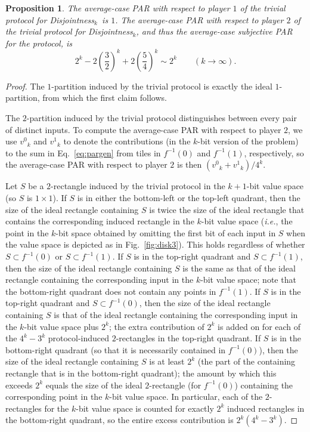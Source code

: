 \documentclass{article}
\theoremstyle{theorem}
\newtheorem{prop}[theorem]{Proposition}
\theoremstyle{definition}
\theoremstyle{remark}
\newcommand{\ie}{\emph{i.e.}}
\newcommand{\disjoint}{{\sc Dis\-joint\-ness}\ensuremath{_k}}
\newcommand{\svn}{\ensuremath{v^0}}
\newcommand{\svy}{\ensuremath{v^1}}
\begin{document}
\begin{prop}
The average-case PAR with respect to player $1$ of the trivial protocol for \disjoint\ is $1$.  The average-case PAR with respect to player $2$ of the trivial protocol for \disjoint, and thus the average-case subjective PAR for the protocol, is
\[
2^k -2\left(\frac{3}{2}\right)^k + 2\left(\frac{5}{4}\right)^k \sim 2^k\qquad (k\rightarrow\infty).
\]
\end{prop}
\begin{proof}
The $1$-partition induced by the trivial protocol is exactly the ideal $1$-partition, from which the first claim follows.

The $2$-partition induced by the trivial protocol distinguishes between every pair of distinct inputs.  To compute the average-case PAR with respect to player $2$, we use $\svn_k$ and $\svy_k$ to denote the contributions (in the $k$-bit version of the problem) to the sum in Eq.~\ref{eq:pargen} from tiles in $f^{-1}(0)$ and $f^{-1}(1)$, respectively, so the average-case PAR with respect to player $2$ is then $\left(\svn_k+\svy_k\right)/4^k$.

Let $S$ be a $2$-rectangle induced by the trivial protocol in the $k+1$-bit value space (so $S$ is $1\times 1$).  If $S$ is in either the bottom-left or the top-left quadrant, then the size of the ideal rectangle containing $S$ is twice the size of the ideal rectangle that contains the corresponding induced rectangle in the $k$-bit value space (\ie, the point in the $k$-bit space obtained by omitting the first bit of each input in $S$ when the value space is depicted as in Fig.~\ref{fig:disk3}).  This holds regardless of whether $S\subset f^{-1}(0)$ or $S\subset f^{-1}(1)$.  If $S$ is in the top-right quadrant and $S\subset f^{-1}(1)$, then the size of the ideal rectangle containing $S$ is the same as that of the ideal rectangle containing the corresponding input in the $k$-bit value space; note that the bottom-right quadrant does not contain any points in $f^{-1}(1)$.  If $S$ is in the top-right quadrant and $S\subset f^{-1}(0)$, then the size of the ideal rectangle containing $S$ is that of the ideal rectangle containing the corresponding input in the $k$-bit value space plus $2^k$; the extra contribution of $2^k$ is added on for each of the $4^k-3^k$ protocol-induced $2$-rectangles in the top-right quadrant.  If $S$ is in the bottom-right quadrant (so that it is necessarily contained in $f^{-1}(0)$), then the size of the ideal rectangle containing $S$ is at least $2^k$ (the part of the containing rectangle that is in the bottom-right quadrant); the amount by which this exceeds $2^k$ equals the size of the ideal $2$-rectangle (for $f^{-1}(0)$) containing the corresponding point in the $k$-bit value space.  In particular, each of the $2$-rectangles for the $k$-bit value space is counted for exactly $2^k$ induced rectangles in the bottom-right quadrant, so the entire excess contribution is $2^k (4^k-3^k)$.


\end{proof}
\end{document}
